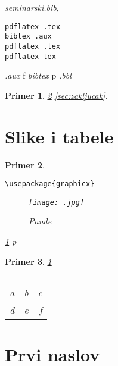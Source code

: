 \documentclass[a4paper]{article}
\newtheorem{primer}{Primer}[section]
\begin{document}
 {\em seminarski.bib},  
\begin{verbatim}
pdflatex .tex 
bibtex .aux 
pdflatex .tex 
pdflatex tex 
\end{verbatim}
 {\em .aux} f {\em bibtex} p {\em .bbl}  


 
\begin{primer}
\ref{sec:naslov1}  \ref{sec:zakljucak}.
\end{primer}




\section{Slike i tabele}
\label{slike_i_tabele}

 

\begin{primer} 
\begin{verbatim}
\usepackage{graphicx}
\end{verbatim}

\begin{figure}[h!]
\begin{center}
\texttt{[image: .jpg]}
\end{center}
\caption{Pande}
\label{fig:pande}
\end{figure}

 \ref{fig:pande} p
\end{primer}

\begin{primer}  \ref{tab:tabela1} 

\begin{table}[h!]
\begin{center}
\caption{}
\begin{tabular}{|c|l|r|} \hline
& \\ \hline
a &b&c\\ \hline
d &e&f\\ \hline
\end{tabular}
\label{tab:tabela1}
\end{center}
\end{table}

\end{primer}





\section{Prvi naslov}
\label{sec:naslov1}
\end{document}
